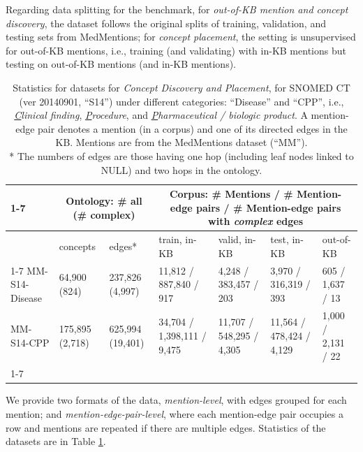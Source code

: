 \documentclass[sigconf]{acmart}
\begin{document}
Regarding data splitting for the benchmark, for \textit{out-of-KB mention and concept discovery}, the dataset follows the original splits of training, validation, and testing sets from MedMentions; for \textit{concept placement}, the setting is unsupervised for out-of-KB mentions, i.e., training (and validating) with in-KB mentions but testing on out-of-KB mentions (and in-KB mentions).

\begin{table}[ht]
\small
\caption{Statistics for datasets for \textit{Concept Discovery and Placement}, for SNOMED CT (ver 20140901, ``S14'') under different categories: ``Disease'' and ``CPP'', i.e., \textit{\underline{C}linical finding}, \textit{\underline{P}rocedure}, and \textit{\underline{P}harmaceutical / biologic product}. A mention-edge pair denotes a mention (in a corpus) and one of its directed edges in the KB. Mentions are from the MedMentions dataset (``MM''). \\
* The numbers of edges are those having one hop (including leaf nodes linked to NULL) and two hops in the ontology.
}\label{data-statistics}
\begin{tabular}{l|l|l|lll|l}
\cline{1-7}

                                            & \multicolumn{2}{c}{Ontology: \# all (\# complex) }                                           & \multicolumn{4}{|c}{Corpus: \# Mentions / \# Mention-edge pairs / \# Mention-edge pairs with \textit{complex} edges}                             \\ \hline                       & concepts & edges* & train, in-KB   & valid, in-KB & test, in-KB & out-of-KB \\
\cline{1-7}
MM-S14-Disease & 64,900 (824)        & 237,826 (4,997)      & 11,812 / 887,840 / 917  & 4,248 / 383,457 / 203    & 3,970 / 316,319 / 393    & 605 / 1,637 / 13 \\             
MM-S14-CPP     & 175,895 (2,718)      & 625,994 (19,401)     & 34,704 / 1,398,111 / 9,475 & 11,707 / 548,295 / 4,305     & 11,564 / 478,424 / 4,129     & 1,000 / 2,131 / 22                  \\
\cline{1-7}
\end{tabular}
\end{table}

We provide two formats of the data, \textit{mention-level}, with edges grouped for each mention; and \textit{mention-edge-pair-level}, where each mention-edge pair occupies a row and mentions are repeated if there are multiple edges. Statistics of the datasets are in Table \ref{data-statistics}.
\end{document}

